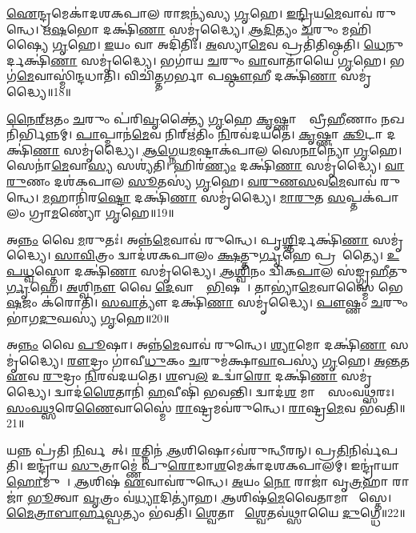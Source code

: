 \ul{𑌐}𑌨𑍍𑌦𑍍𑌰𑌮𑍇𑌕𑌾॑𑌦𑌶𑌕𑌪𑌾𑌲 𑌰𑌾\ul{𑌜}𑌨𑍍𑌯॑𑌸𑍍𑌯 \ul{𑌗𑍃}𑌹𑍇।
\ul{𑌇}\ul{𑌨𑍍𑌦𑍍𑌰𑌿}𑌯\ul{𑌮𑍇}𑌵𑌾𑌵॑ 𑌰𑍁𑌨𑍍𑌧𑍇।
\ul{𑌋}\ul{𑌷}𑌭𑍋 𑌦𑌕𑍍𑌷𑌿॑\ul{𑌣𑌾} 𑌸𑌮𑍃॑𑌦𑍍𑌧𑍍𑌯𑍈।
\ul{𑌆}\ul{𑌦𑌿}𑌤𑍍𑌯𑌂 \ul{𑌚}𑌰𑍁𑌂 𑌮𑌹𑌿॑𑌷𑍍𑌯𑍈 \ul{𑌗𑍃}𑌹𑍇।
\ul{𑌇}𑌯𑌂 𑌵𑌾 𑌅𑌦𑌿॑𑌤𑌿𑌃।
\ul{𑌅}𑌸𑍍𑌯𑌾\ul{𑌮𑍇}𑌵 𑌪𑍍𑌰𑌤𑌿॑𑌤𑌿𑌷𑍍𑌠𑌤𑌿।
\ul{𑌧𑍇}𑌨𑍁𑌰𑍍𑌦𑌕𑍍𑌷𑌿॑\ul{𑌣𑌾} 𑌸𑌮𑍃॑𑌦𑍍𑌧𑍍𑌯𑍈।
𑌭𑌗𑌾॑𑌯 \ul{𑌚}𑌰𑍁𑌂 \ul{𑌵𑌾}𑌵𑌾𑌤𑌾॑𑌯𑍈 \ul{𑌗𑍃}𑌹𑍇।
𑌭𑌗॑\ul{𑌮𑍇}𑌵𑌾𑌸𑍍𑌮𑌿॑𑌨𑍍𑌦𑌧𑌾𑌤𑌿।
𑌵𑌿𑌚𑌿॑𑌤𑍍𑌤𑌗𑌰𑍍𑌭𑌾 𑌪\ul{𑌷𑍍𑌠𑍗}𑌹𑍀 𑌦𑌕𑍍𑌷𑌿॑\ul{𑌣𑌾} 𑌸𑌮𑍃॑𑌦𑍍𑌧𑍍𑌯𑍈॥18॥

\ul{𑌨𑍈}\ul{𑌰𑍍}\ul{𑌋}𑌤𑌂 \ul{𑌚}𑌰𑍁𑌂 𑌪॑𑌰𑌿\ul{𑌵𑍃}𑌕𑍍𑌤𑍍𑌯𑍈॑ \ul{𑌗𑍃}𑌹𑍇 \ul{𑌕𑍃}𑌷𑍍𑌣𑌾𑌨𑌾𑌂᳚ 𑌵𑍍𑌰𑍀\ul{𑌹𑍀}𑌣𑌾𑌂 \ul{𑌨}𑌖𑌨𑌿॑𑌰𑍍𑌭𑌿𑌨𑍍𑌨𑌮𑍍।
\ul{𑌪𑌾}𑌪𑍍𑌮𑌾𑌨॑\ul{𑌮𑍇}𑌵 𑌨𑌿𑌰𑍍\mbox{}𑌋॑𑌤𑌿𑌂 \ul{𑌨𑌿}𑌰𑌵॑𑌦𑌯𑌤𑍇।
\ul{𑌕𑍃}𑌷𑍍𑌣𑌾 \ul{𑌕𑍂}𑌟𑌾 𑌦𑌕𑍍𑌷𑌿॑\ul{𑌣𑌾} 𑌸𑌮𑍃॑𑌦𑍍𑌧𑍍𑌯𑍈।
\ul{𑌆}\ul{𑌗𑍍𑌨𑍇}𑌯\ul{𑌮}𑌷𑍍𑌟𑌾𑌕॑𑌪𑌾𑌲 𑌸𑍇\ul{𑌨𑌾}𑌨𑍍𑌯𑍋॑ \ul{𑌗𑍃}𑌹𑍇।
𑌸𑍇𑌨𑌾॑\ul{𑌮𑍇}𑌵𑌾\ul{𑌸𑍍𑌯} 𑌸𑌶𑍍𑌯॑𑌤𑌿।
𑌹𑌿𑌰॑\ul{𑌣𑍍𑌯𑌂} 𑌦𑌕𑍍𑌷𑌿॑\ul{𑌣𑌾} 𑌸𑌮𑍃॑𑌦𑍍𑌧𑍍𑌯𑍈।
\ul{𑌵𑌾}\ul{𑌰𑍁}𑌣𑌂 𑌦𑌶॑𑌕𑌪𑌾𑌲 \ul{𑌸𑍂}𑌤𑌸𑍍𑌯॑ \ul{𑌗𑍃}𑌹𑍇।
\ul{𑌵}\ul{𑌰𑍁}\ul{𑌣}\ul{𑌸}𑌵\ul{𑌮𑍇}𑌵𑌾𑌵॑ 𑌰𑍁𑌨𑍍𑌧𑍇।
\ul{𑌮}𑌹𑌾𑌨𑌿॑𑌰\ul{𑌷𑍍𑌟𑍋} 𑌦𑌕𑍍𑌷𑌿॑\ul{𑌣𑌾} 𑌸𑌮𑍃॑𑌦𑍍𑌧𑍍𑌯𑍈।
\ul{𑌮𑌾}\ul{𑌰𑍁}𑌤 \ul{𑌸}𑌪𑍍𑌤𑌕॑𑌪𑌾𑌲𑌂 𑌗𑍍𑌰𑌾\ul{𑌮}𑌣𑍍𑌯𑍋॑ \ul{𑌗𑍃}𑌹𑍇॥19॥

𑌅\ul{𑌨𑍍𑌨𑌂} 𑌵𑍈 \ul{𑌮}𑌰𑍁𑌤𑌃॑।
𑌅𑌨𑍍𑌨॑\ul{𑌮𑍇}𑌵𑌾𑌵॑ 𑌰𑍁𑌨𑍍𑌧𑍇।
𑌪𑍃\ul{𑌶𑍍𑌞𑌿}𑌰𑍍𑌦𑌕𑍍𑌷𑌿॑\ul{𑌣𑌾} 𑌸𑌮𑍃॑𑌦𑍍𑌧𑍍𑌯𑍈।
\ul{𑌸𑌾}\ul{𑌵𑌿}𑌤𑍍𑌰𑌂 𑌦𑍍𑌵𑌾𑌦॑𑌶𑌕𑌪𑌾𑌲𑌂 \ul{𑌕𑍍𑌷}𑌤𑍍𑌤𑍁\ul{𑌰𑍍𑌗𑍃}𑌹𑍇 𑌪𑍍𑌰𑌸𑍂᳚𑌤𑍍𑌯𑍈।
\ul{𑌉}\ul{𑌪}\ul{𑌧𑍍𑌵}𑌸𑍍𑌤𑍋 𑌦𑌕𑍍𑌷𑌿॑\ul{𑌣𑌾} 𑌸𑌮𑍃॑𑌦𑍍𑌧𑍍𑌯𑍈।
\ul{𑌆}\ul{𑌶𑍍𑌵𑌿}𑌨𑌂 𑌦𑍍𑌵𑌿॑𑌕\ul{𑌪𑌾}𑌲 𑌸॑𑌙𑍍𑌗𑍍𑌰\ul{𑌹𑍀}𑌤𑍁\ul{𑌰𑍍𑌗𑍃}𑌹𑍇।
\ul{𑌅}𑌶𑍍𑌵𑌿\ul{𑌨𑍗} 𑌵𑍈 \ul{𑌦𑍇}𑌵𑌾𑌨𑌾𑌂᳚ \ul{𑌭𑌿}𑌷𑌜𑍗᳚।
𑌤𑌾𑌭𑍍𑌯𑌾॑\ul{𑌮𑍇}𑌵𑌾𑌸𑍍𑌮𑍈॑ 𑌭𑍇\ul{𑌷}𑌜𑌂 𑌕॑𑌰𑍋𑌤𑌿।
\ul{𑌸}\ul{𑌵𑌾}𑌤𑍍𑌯𑍗॑ 𑌦𑌕𑍍𑌷𑌿॑\ul{𑌣𑌾} 𑌸𑌮𑍃॑𑌦𑍍𑌧𑍍𑌯𑍈।
\ul{𑌪𑍗}𑌷𑍍𑌣𑌂 \ul{𑌚}𑌰𑍁𑌂 𑌭𑌾॑𑌗\ul{𑌦𑍁}𑌘𑌸𑍍𑌯॑ \ul{𑌗𑍃}𑌹𑍇॥20॥

𑌅\ul{𑌨𑍍𑌨𑌂} 𑌵𑍈 \ul{𑌪𑍂}𑌷𑌾।
𑌅𑌨𑍍𑌨॑\ul{𑌮𑍇}𑌵𑌾𑌵॑ 𑌰𑍁𑌨𑍍𑌧𑍇।
\ul{𑌶𑍍𑌯𑌾}𑌮𑍋 𑌦𑌕𑍍𑌷𑌿॑\ul{𑌣𑌾} 𑌸𑌮𑍃॑𑌦𑍍𑌧𑍍𑌯𑍈।
\ul{𑌰𑍗}𑌦𑍍𑌰𑌂 𑌗𑌾॑𑌵𑍀\ul{𑌧𑍁}𑌕𑌂 \ul{𑌚}𑌰𑍁𑌮॑𑌕𑍍𑌷𑌾\ul{𑌵𑌾}𑌪𑌸𑍍𑌯॑ \ul{𑌗𑍃}𑌹𑍇।
\ul{𑌅}\ul{𑌨𑍍𑌤}𑌤 \ul{𑌏}𑌵 \ul{𑌰𑍁}𑌦𑍍𑌰𑌂 \ul{𑌨𑌿}𑌰𑌵॑𑌦𑌯𑌤𑍇।
\ul{𑌶}𑌬\ul{𑌲} 𑌉𑌦𑍍𑌵𑌾॑\ul{𑌰𑍋} 𑌦𑌕𑍍𑌷𑌿॑\ul{𑌣𑌾} 𑌸𑌮𑍃॑𑌦𑍍𑌧𑍍𑌯𑍈।
𑌦𑍍𑌵𑌾𑌦॑\ul{𑌶𑍈}𑌤𑌾𑌨𑌿॑ \ul{𑌹}𑌵𑍀𑌷𑌿॑ 𑌭𑌵𑌨𑍍𑌤𑌿।
𑌦𑍍𑌵𑌾𑌦॑\ul{𑌶} 𑌮𑌾𑌸𑌾𑌃᳚ 𑌸𑌂𑌵\ul{𑌥𑍍𑌸}𑌰𑌃।
\ul{𑌸𑌂}\ul{𑌵}\ul{𑌥𑍍𑌸}𑌰𑍇\ul{𑌣𑍈}𑌵𑌾𑌸𑍍𑌮𑍈॑ \ul{𑌰𑌾}𑌷𑍍𑌟𑍍𑌰𑌮𑌵॑𑌰𑍁𑌨𑍍𑌧𑍇।
\ul{𑌰𑌾}𑌷𑍍𑌟𑍍𑌰\ul{𑌮𑍇}𑌵 𑌭॑𑌵𑌤𑌿॥21॥

𑌯𑌨𑍍𑌨 𑌪𑍍𑌰॑𑌤𑌿 \ul{𑌨𑌿}𑌰𑍍𑌵𑌪𑍇᳚𑌤𑍍।
\ul{𑌰}𑌤𑍍𑌨𑌿𑌨॑ \ul{𑌆}𑌶𑌿𑌷𑍋\-𑌽𑌵॑𑌰𑍁𑌨𑍍𑌧𑍀𑌰𑌨𑍍।
𑌪𑍍𑌰\ul{𑌤𑌿}𑌨𑌿𑌰𑍍𑌵॑𑌪𑌤𑌿।
𑌇𑌨𑍍𑌦𑍍𑌰𑌾॑𑌯 \ul{𑌸𑍁}𑌤𑍍𑌰𑌾𑌮𑍍𑌣𑍇॑ 𑌪𑍁\ul{𑌰𑍋}𑌡𑌾\ul{𑌶}𑌮𑍇𑌕𑌾॑𑌦𑌶𑌕𑌪𑌾𑌲𑌮𑍍।
𑌇𑌨𑍍𑌦𑍍𑌰𑌾॑𑌯𑌾\ul{𑌹𑍋}𑌮𑍁𑌚𑍇᳚।
\ul{𑌆}𑌶𑌿𑌷॑ \ul{𑌏}𑌵𑌾𑌵॑𑌰𑍁𑌨𑍍𑌧𑍇।
\ul{𑌅}𑌯𑌂 \ul{𑌨𑍋} 𑌰𑌾𑌜𑌾॑ 𑌵𑍃\ul{𑌤𑍍𑌰}𑌹𑌾 𑌰𑌾𑌜𑌾॑ \ul{𑌭𑍂}𑌤𑍍𑌵𑌾 \ul{𑌵𑍃}𑌤𑍍𑌰𑌂 𑌵॑\ul{𑌧𑍍𑌯𑌾}𑌦𑌿𑌤𑍍𑌯𑌾॑𑌹।
\ul{𑌆}𑌶𑌿𑌷॑\ul{𑌮𑍇}𑌵𑍈𑌤𑌾𑌮𑌾 𑌶𑌾᳚𑌸𑍍𑌤𑍇।
\ul{𑌮𑍈}\ul{𑌤𑍍𑌰𑌾}\ul{𑌬𑌾}\ul{𑌰𑍍}\ul{𑌹}\ul{𑌸𑍍𑌪}𑌤𑍍𑌯𑌂 𑌭॑𑌵𑌤𑌿।
\ul{𑌶𑍍𑌵𑍇}𑌤𑌾𑌯𑍈᳚ \ul{𑌶𑍍𑌵𑍇}𑌤𑌵॑𑌥𑍍𑌸𑌾𑌯𑍈 \ul{𑌦𑍁}𑌗𑍍𑌧𑍇॥22॥

